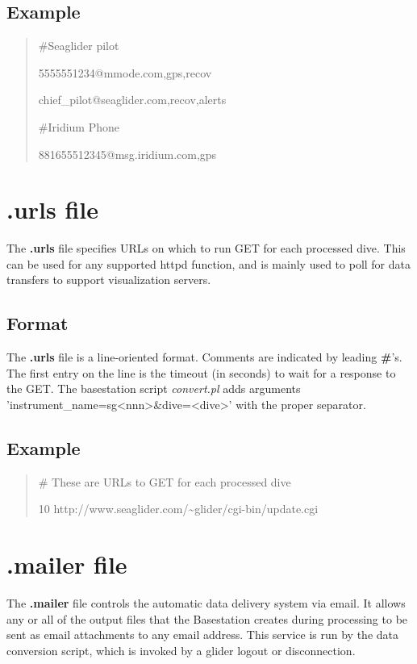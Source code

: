 \documentclass[12pt,english,twoside]{book}
\begin{document}
\subsection{Example}
\begin{quotation}

\#Seaglider pilot

5555551234@mmode.com,gps,recov

chief\_pilot@seaglider.com,recov,alerts

\#Iridium Phone

881655512345@msg.iridium.com,gps
\end{quotation}

\section{.urls file}

The \textbf{.urls} file specifies URLs on which to run GET for each
processed dive. This can be used for any supported httpd function,
and is mainly used to poll for data transfers to support visualization
servers.

\subsection{Format}

The \textbf{.urls} file is a line-oriented format. Comments are indicated
by leading \textbf{\#}'s. The first entry on the line is the timeout
(in seconds) to wait for a response to the GET. The basestation script
\emph{convert.pl} adds arguments 'instrument\_name=sg<nnn>\&dive=<dive>'
with the proper separator.


\subsection{Example}
\begin{quotation}
\# These are URLs to GET for each processed dive

10 http://www.seaglider.com/\textasciitilde{}glider/cgi-bin/update.cgi
\end{quotation}

\section{.mailer file}

The \textbf{.mailer} file controls the automatic data delivery system via email.
It allows any or all of the output files that the Basestation creates during
processing to be sent as email attachments to any email address. This service is
run by the data conversion script, which is invoked by a glider logout or
disconnection.
\end{document}
